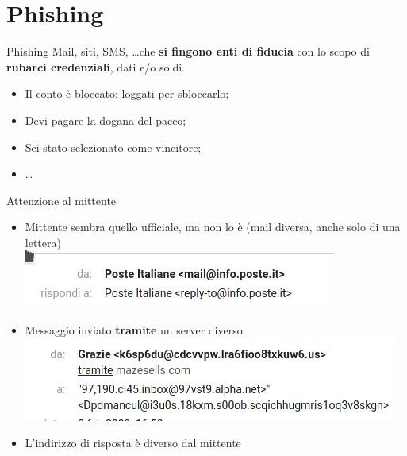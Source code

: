 
\section{Phishing}

\begin{myframe}{Phishing}
  Mail, siti, SMS, \dots che \textbf{si fingono enti di fiducia} con lo scopo di \textbf{rubarci credenziali}, dati e/o soldi.

  \begin{itemize}
    \item Il conto è bloccato: loggati per sbloccarlo;
    \item Devi pagare la dogana del pacco;
    \item Sei stato selezionato come vincitore;
    \item \dots
  \end{itemize}
\end{myframe}

\begin{myframe}{Attenzione al mittente}
  \begin{itemize}[<+->]
    \item Mittente sembra quello ufficiale, ma non lo è (mail diversa, anche solo di una lettera) \\
      \includegraphics[width=.5\textwidth]{img/phishing/mittente}
    \item Messaggio inviato \textbf{tramite} un server diverso \\
      \includegraphics[width=.5\textwidth]{img/phishing/destinatario}
    \item L'indirizzo di risposta è diverso dal mittente
  \end{itemize}

  \medskip{}
\end{myframe}

